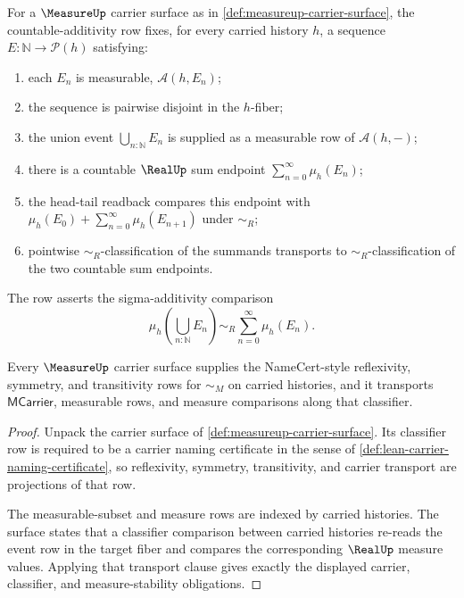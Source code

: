 \begin{definition}
\label{def:measureup-countable-additivity-row}
For a $\MeasureUp$ carrier surface as in
\autoref{def:measureup-carrier-surface}, the countable-additivity row fixes,
for every carried history $h$, a sequence $E:\mathbb{N}\to\mathcal{P}(h)$
satisfying:
\begin{enumerate}
\item each $E_n$ is measurable, $\mathcal{A}(h,E_n)$;
\item the sequence is pairwise disjoint in the $h$-fiber;
\item the union event $\bigcup_{n:\mathbb{N}}E_n$ is supplied as a measurable
row of $\mathcal{A}(h,-)$;
\item there is a countable $\RealUp$ sum endpoint
$\sum_{n=0}^{\infty}\mu_h(E_n)$;
\item the head-tail readback compares this endpoint with
$\mu_h(E_0)+\sum_{n=0}^{\infty}\mu_h(E_{n+1})$ under $\sim_R$;
\item pointwise $\sim_R$-classification of the summands transports to
$\sim_R$-classification of the two countable sum endpoints.
\end{enumerate}
The row asserts the sigma-additivity comparison
$$
\mu_h\left(\bigcup_{n:\mathbb{N}}E_n\right)\sim_R
\sum_{n=0}^{\infty}\mu_h(E_n).
$$
\end{definition}

\begin{theorem}
\label{thm:measure-carrier-classifier-obligations}
Every $\MeasureUp$ carrier surface supplies the NameCert-style reflexivity,
symmetry, and transitivity rows for $\sim_M$ on carried histories, and it
transports $\mathsf{MCarrier}$, measurable rows, and measure comparisons along
that classifier.
\end{theorem}
\begin{proof}
Unpack the carrier surface of \autoref{def:measureup-carrier-surface}. Its
classifier row is required to be a carrier naming certificate in the sense of
\autoref{def:lean-carrier-naming-certificate}, so reflexivity, symmetry,
transitivity, and carrier transport are projections of that row.

The measurable-subset and measure rows are indexed by carried histories. The
surface states that a classifier comparison between carried histories re-reads
the event row in the target fiber and compares the corresponding $\RealUp$
measure values. Applying that transport clause gives exactly the displayed
carrier, classifier, and measure-stability obligations.
\end{proof}

